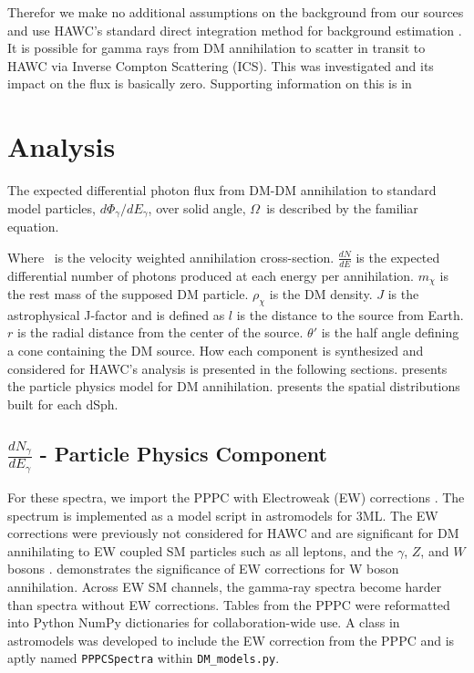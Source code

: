 Therefor we make no additional assumptions on the background from our sources and use HAWC's standard direct integration method for background estimation \cite{Abeysekara_2017}.
It is possible for gamma rays from DM annihilation to scatter in transit to HAWC via Inverse Compton Scattering (ICS).
This was investigated and its impact on the flux is basically zero.
Supporting information on this is in 

\section{Analysis}\label{sec:gd_analysis}

The expected differential photon flux from DM-DM annihilation to standard model
particles, $d\Phi_{\gamma}/dE_{\gamma}$, over solid angle, $\Omega$~is described by the familiar equation.
\iddmannilation[\gamma]

Where \sv~is the velocity weighted annihilation cross-section.
$\frac{dN}{dE}$ is the expected differential number of photons produced at each energy per annihilation.
$m_\chi$ is the rest mass of the supposed DM particle.
$\rho_{\chi}$ is the DM density.
$J$ is the astrophysical J-factor and is defined as
\jfactor
$l$ is the distance to the source from Earth.
$r$ is the radial distance from the center of the source.
$\theta'$ is the half angle defining a cone containing the DM source.
How each component is synthesized and considered for HAWC's analysis is presented in the following sections.
 presents the particle physics model for DM annihilation.
 presents the spatial distributions built for each dSph.

\subsection{$\frac{dN_\gamma}{dE_\gamma}$ - Particle Physics Component}\label{sec:gd_particlephysics}

For these spectra, we import the PPPC with Electroweak (EW) corrections \cite{Cirelli_2011}.
The spectrum is implemented as a model script in astromodels for 3ML.
The EW corrections were previously not considered for HAWC and are significant for DM annihilating to EW coupled SM particles such as all leptons, and the $\gamma$, $Z$, and $W$ bosons \cite{Albert_2018}.
 demonstrates the significance of EW corrections for W boson annihilation.
Across EW SM channels, the gamma-ray spectra become harder than spectra without EW corrections.
Tables from the PPPC were reformatted into Python NumPy dictionaries for collaboration-wide use.
A class in astromodels was developed to include the EW correction from the PPPC and is aptly named \texttt{PPPCSpectra} within \texttt{DM\_models.py}.

